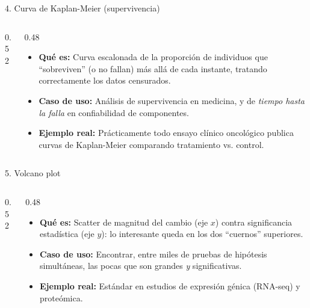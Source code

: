 \documentclass[aspectratio=169,9pt]{beamer}
\newcommand{\ficha}[3]{%
\begin{itemize}
\item \textbf{Qué es:} #1
\item \textbf{Caso de uso:} #2
\item \textbf{Ejemplo real:} #3
\end{itemize}}
\begin{document}
\begin{frame}{4. Curva de Kaplan-Meier (supervivencia)}
\begin{columns}[T]
\begin{column}{0.52\textwidth}
\centering
{}
\end{column}
\begin{column}{0.48\textwidth}
\ficha{Curva escalonada de la proporción de individuos que ``sobreviven'' (o no fallan) más allá de cada instante, tratando correctamente los datos censurados.}
{Análisis de supervivencia en medicina, y de \emph{tiempo hasta la falla} en confiabilidad de componentes.}
{Prácticamente todo ensayo clínico oncológico publica curvas de Kaplan-Meier comparando tratamiento vs. control.}
\end{column}
\end{columns}
\end{frame}

\begin{frame}{5. Volcano plot}
\begin{columns}[T]
\begin{column}{0.52\textwidth}
\centering
{}
\end{column}
\begin{column}{0.48\textwidth}
\ficha{Scatter de magnitud del cambio (eje $x$) contra significancia estadística (eje $y$): lo interesante queda en los dos ``cuernos'' superiores.}
{Encontrar, entre miles de pruebas de hipótesis simultáneas, las pocas que son grandes \emph{y} significativas.}
{Estándar en estudios de expresión génica (RNA-seq) y proteómica.}
\end{column}
\end{columns}
\end{frame}
\end{document}
